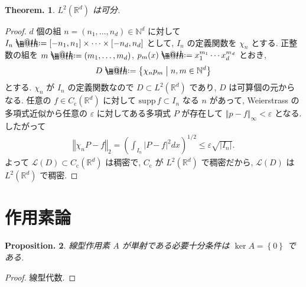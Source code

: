 \documentclass[openany, a4paper, oneside]{jsbook}
\makeatletter
\newcommand*{\defeq}{\mathrel{\rlap{%
\raisebox{0.3ex}{$\m@th\cdot$}}%
\raisebox{-0.3ex}{$\m@th\cdot$}}%
=}
\theoremstyle{break}
\newtheorem{thm}{Theorem.}[section]
\newtheorem{prop}[thm]{Proposition.}
\theoremstyle{breakdefn}
\newcommand{\abs}[1]{\left|#1\right|}
\newcommand{\norm}[1]{\left\Vert#1\right\Vert}
\newcommand{\rbk}[1]{\left (#1\right)}
\newcommand{\cbk}[1]{\left\{#1\right\}}
\newcommand{\relmiddle}[1]{\mathrel{}\middle#1\mathrel{}}
\newcommand{\set}[2]{\left\{#1 \relmiddle| #2\right\}}
\newcommand{\bbN}{\mathbb{N}}
\newcommand{\bbRd}{\mathbb{R}^d}
\newcommand{\calL}{\mathcal{L}}
\newcommand{\supp}{\mathrm{supp} \,}
\makeatother
\begin{document}
\begin{thm}
 $L^2 (\bbRd)$ は可分.
\end{thm}
\begin{proof}
$d$ 個の組 $n = (n_{1}, \dots, n_{d}) \in \bbN^d$ に対して
$I_{n} \defeq [-n_{1}, n_{1}] \times \cdots \times[-n_{d}, n_{d}]$
として, $I_{n}$ の定義関数を $\chi_{n}$ とする.
正整数の組を $m \defeq  (m_1, \dots, m_d)$, $p_m (x) \defeq x_1^{m_1} \cdots x_d^{m_d}$ とおき,
\begin{align}
 D
 \defeq
 \set{\chi_n p_m}{n, m \in \bbN^d}
\end{align}
とする.
$\chi_{n}$ が $I_{n}$ の定義関数なので $D \subset L^2 (\bbRd)$ であり, $D$ は可算個の元からなる.
任意の $f \in C_{\mathrm{c}}(\bbRd)$ に対して $\supp f \subset I_{n}$ なる $n$ があって,
Weierstrass の多項式近似から任意の $\varepsilon$ に対してある多項式 $P$ が存在して
$\norm{p - f}_{\infty} < \varepsilon$ となる.
したがって
\begin{align}
 \norm{\chi_n P -f}_{2}
 =
 \rbk{\int_{I_n} \abs{P - f}^2 dx}^{1/2}
 \leq
 \varepsilon \sqrt{\abs{I_n}}.
\end{align}
よって $\calL (D)\subset C_{\mathrm{c}}(\bbRd)$ は稠密で,
$C_{\mathrm{c}}$ が $L^2 (\bbRd)$ で稠密だから, $\calL (D)$ は $L^2 (\bbRd)$ で稠密.
\end{proof}
\section{作用素論}


\begin{prop}
 線型作用素 $A$ が単射である必要十分条件は $\ker A = \cbk{0}$ である.
\end{prop}
\begin{proof}
線型代数.
\end{proof}
\end{document}

